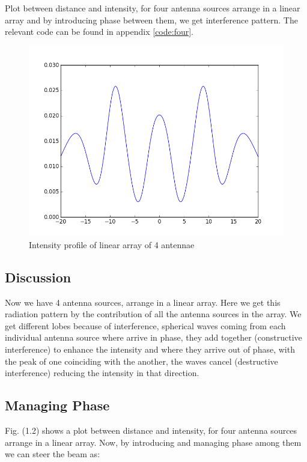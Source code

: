 Plot between distance and intensity, for four antenna sources arrange in a linear array and by introducing phase between them, we get interference pattern. The relevant code can be found in appendix \ref{code:four}.

\begin{figure}[!h]
	\centering	
    \includegraphics[scale=0.45]{figure_2.png}
	\caption{Intensity profile of linear array of 4 antennae}
\end{figure}

\subsection{Discussion}
Now we have 4 antenna sources, arrange in a linear array. Here we get this radiation pattern by the contribution of all the antenna sources in the array. We get different lobes because of interference, spherical waves coming from each individual antenna source where arrive in phase, they add together (constructive interference) to enhance the intensity and where they arrive out of phase, with the peak of one coinciding with the another, the waves cancel (destructive interference) reducing the intensity in that direction.

\subsection{Managing Phase}

Fig. (1.2) shows a plot between distance and intensity, for four antenna sources arrange in a linear array. Now, by introducing and managing phase among them we can steer the beam as:

